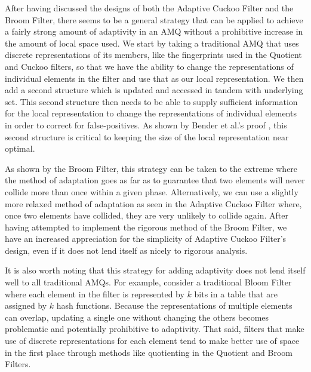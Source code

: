 \documentclass[../paper.tex]{subfiles}
\begin{document}
After having discussed the designs of both the Adaptive Cuckoo Filter and the 
Broom Filter, there seems to be a general strategy that can be applied to 
achieve a fairly strong amount of adaptivity in an AMQ without a prohibitive 
increase in the amount of local space used.  We start by taking a traditional 
AMQ that uses discrete representations of its members, like the fingerprints 
used in the Quotient and Cuckoo filters, so that we have the ability to 
change the representations of individual elements in the filter and use that as 
our local representation.  We then add a second structure which is updated and 
accessed in tandem with underlying set.  This second structure then needs to be 
able to supply sufficient information for the local representation to change the 
representations of individual elements in order to correct for false-positives.  As 
shown by Bender et al.'s proof \cite{broom-filter}, this second structure is 
critical to keeping the size of the local representation near optimal.  

	As shown by the Broom Filter, this strategy can be taken to the extreme where the 
	method of adaptation goes as far as to guarantee that two elements will never 
	collide more than once within a given phase.  Alternatively, we can use a slightly 
	more relaxed method of adaptation as seen in the Adaptive Cuckoo Filter where, 
	once two elements have collided, they are very unlikely to collide again.  After 
	having attempted to implement the rigorous method of the Broom Filter, we have
	an increased appreciation for the simplicity of Adaptive Cuckoo Filter's design, 
	even if it does not lend itself as nicely to rigorous analysis.  
	
	It is also worth noting that this strategy for adding adaptivity does not lend itself 
	well to all traditional AMQs.  For example, consider a traditional Bloom Filter where 
	each element in the filter is represented by $k$ bits in a table that are assigned by 
	$k$ hash functions.  Because the representations of multiple elements can overlap, 
	updating a single one without changing the others becomes problematic and 
	potentially prohibitive to adaptivity.  That said, filters that make use of discrete 
	representations for each element tend to make better use of space in the first 
	place through methods like quotienting in the Quotient and Broom Filters.  
\end{document}
